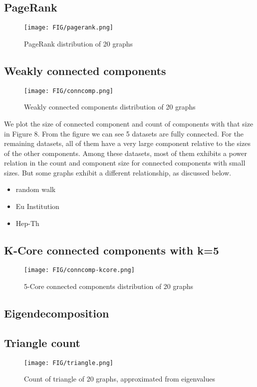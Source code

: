 \subsection{PageRank}
\begin{figure}[H]
\begin{center}
\texttt{[image: FIG/pagerank.png]}
\caption{PageRank distribution of 20 graphs}
\end{center}
\end{figure}



\subsection{Weakly connected components}
\begin{figure}[H]
\begin{center}
\texttt{[image: FIG/conncomp.png]}
\caption{Weakly connected components distribution of 20 graphs}
\end{center}
\end{figure}

We plot the size of connected component and count of components with that size in Figure 8. From the figure we can see 5 datasets are fully connected. For the remaining datasets, all of them have a very large component relative to the sizes of the other components. Among these datasets, most of them exhibits a power relation in the count and component size for connected components with small sizes. But some graphs exhibit a different relationship, as discussed below.

\begin{itemize}
\item random walk
\item Eu Institution
\item Hep-Th
\end{itemize}

\subsection{K-Core connected components with k=5}
\begin{figure}[H]
\begin{center}
\texttt{[image: FIG/conncomp-kcore.png]}
\caption{5-Core connected components distribution of 20 graphs}
\end{center}
\end{figure}

\subsection{Eigendecomposition}
\subsection{Triangle count}
\begin{figure}[H]
\begin{center}
\texttt{[image: FIG/triangle.png]}
\caption{Count of triangle of 20 graphs, approximated from eigenvalues}
\end{center}
\end{figure}